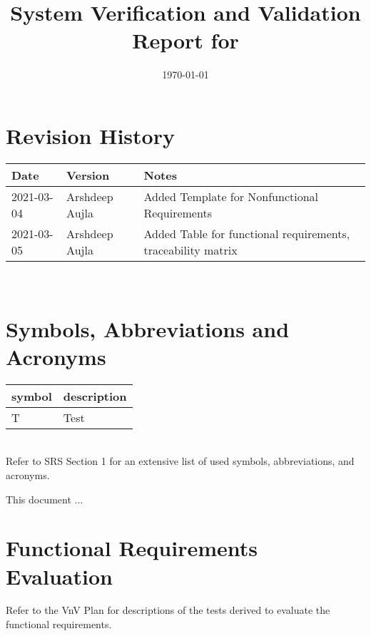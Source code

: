 \documentclass[12pt, titlepage]{article}
\begin{document}
\title{System Verification and Validation Report for \progname{}} 
\author{\authname}
\date{\today}
	
\maketitle


\section{Revision History}

\begin{tabularx}{\textwidth}{p{3cm}p{2cm}X}
\toprule {\bf Date} & {\bf Version} & {\bf Notes}\\
\midrule
2021-03-04 & Arshdeep Aujla & Added Template for Nonfunctional Requirements\\
2021-03-05 & Arshdeep Aujla & Added Table for functional requirements, traceability matrix\\
\bottomrule
\end{tabularx}

~\newpage

\section{Symbols, Abbreviations and Acronyms}

\renewcommand{\arraystretch}{1.2}
\begin{tabular}{l l} 
  \toprule		
  \textbf{symbol} & \textbf{description}\\
  \midrule 
  T & Test\\
  \bottomrule
\end{tabular}\\

Refer to SRS Section 1 for an extensive list of used symbols, abbreviations, and acronyms.

\newpage

\tableofcontents

\listoftables %

\listoffigures %

\newpage


This document ...

\section{Functional Requirements Evaluation}
Refer to the VnV Plan for descriptions of the tests derived to evaluate the functional requirements.
\end{document}
